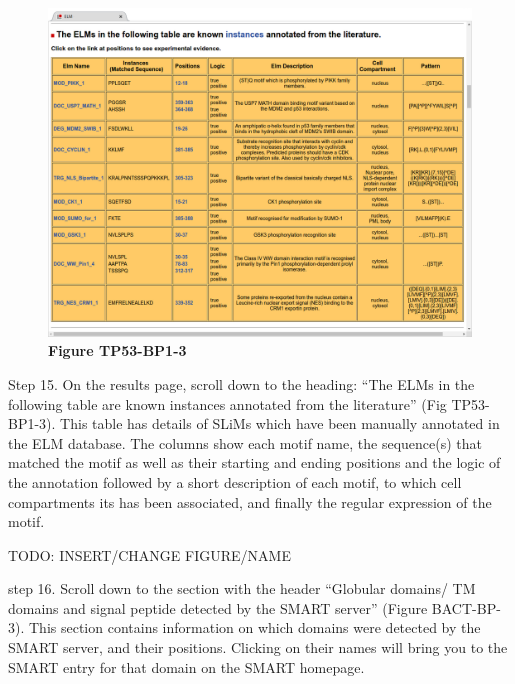 \begin{figure}[h!]
\centering
\includegraphics[width=\textwidth]{Figures/TP53_1/elm_results_known.png} 
\caption{
\textbf{Figure TP53-BP1-3}
}
\end{figure}

Step 15. On the results page, scroll down to the heading: ``The ELMs in
the following table are known instances annotated from the literature''
(Fig TP53-BP1-3). This table has details of SLiMs which have been
manually annotated in the ELM database. The columns show each motif
name, the sequence(s) that matched the motif as well as their starting
and ending positions and the logic of the annotation followed by a short
description of each motif, to which cell compartments its has been
associated, and finally the regular expression of the motif.


TODO: INSERT/CHANGE FIGURE/NAME

step 16. Scroll down to the section with the header ``Globular domains/
TM domains and signal peptide detected by the SMART server'' (Figure
BACT-BP-3). This section contains information on which domains were
detected by the SMART server, and their positions. Clicking on their
names will bring you to the SMART entry for that domain on the SMART
homepage.

